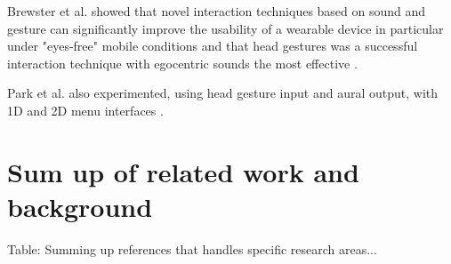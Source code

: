 Brewster et al. showed that novel interaction techniques based on sound and gesture can significantly improve the usability of a wearable device in particular under "eyes-free" mobile conditions and that head gestures was a successful interaction technique with egocentric sounds the most effective \cite{brewster_multimodaleyes-freeinteraction_2003}.

Park et al. also experimented, using head gesture input and aural output, with 1D and 2D menu interfaces \cite{park_gaze-directed_2011}.


\section{Sum up of related work and background}
Table: Summing up references that handles specific research areas...

